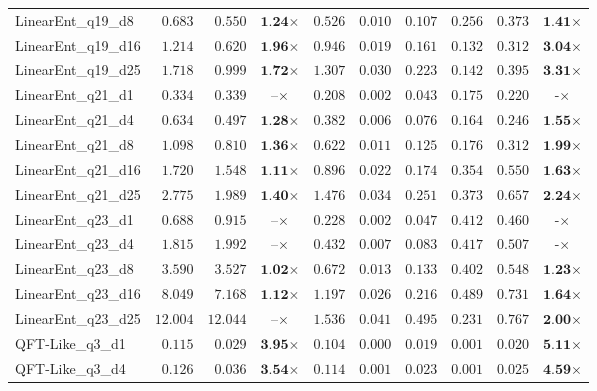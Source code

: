 \begin{table*}[t]
{\begin{tabular}{| l || r r c || r r r r r c |}
LinearEnt\_q19\_d8 & $0.683$ & $0.550$ & $\textbf{1.24}$$\times$ & $0.526$ & $0.010$ & $0.107$ & $0.256$ & $0.373$ & $\textbf{1.41}$$\times$ \\
LinearEnt\_q19\_d16 & $1.214$ & $0.620$ & $\textbf{1.96}$$\times$ & $0.946$ & $0.019$ & $0.161$ & $0.132$ & $0.312$ & $\textbf{3.04}$$\times$ \\
LinearEnt\_q19\_d25 & $1.718$ & $0.999$ & $\textbf{1.72}$$\times$ & $1.307$ & $0.030$ & $0.223$ & $0.142$ & $0.395$ & $\textbf{3.31}$$\times$ \\
LinearEnt\_q21\_d1 & $0.334$ & $0.339$ & $\textbf{--}$$\times$ & $0.208$ & $0.002$ & $0.043$ & $0.175$ & $0.220$ & $\textbf{-}$$\times$ \\
LinearEnt\_q21\_d4 & $0.634$ & $0.497$ & $\textbf{1.28}$$\times$ & $0.382$ & $0.006$ & $0.076$ & $0.164$ & $0.246$ & $\textbf{1.55}$$\times$ \\
LinearEnt\_q21\_d8 & $1.098$ & $0.810$ & $\textbf{1.36}$$\times$ & $0.622$ & $0.011$ & $0.125$ & $0.176$ & $0.312$ & $\textbf{1.99}$$\times$ \\
LinearEnt\_q21\_d16 & $1.720$ & $1.548$ & $\textbf{1.11}$$\times$ & $0.896$ & $0.022$ & $0.174$ & $0.354$ & $0.550$ & $\textbf{1.63}$$\times$ \\
LinearEnt\_q21\_d25 & $2.775$ & $1.989$ & $\textbf{1.40}$$\times$ & $1.476$ & $0.034$ & $0.251$ & $0.373$ & $0.657$ & $\textbf{2.24}$$\times$ \\
LinearEnt\_q23\_d1 & $0.688$ & $0.915$ & $\textbf{--}$$\times$ & $0.228$ & $0.002$ & $0.047$ & $0.412$ & $0.460$ & $\textbf{-}$$\times$ \\
LinearEnt\_q23\_d4 & $1.815$ & $1.992$ & $\textbf{--}$$\times$ & $0.432$ & $0.007$ & $0.083$ & $0.417$ & $0.507$ & $\textbf{-}$$\times$ \\
LinearEnt\_q23\_d8 & $3.590$ & $3.527$ & $\textbf{1.02}$$\times$ & $0.672$ & $0.013$ & $0.133$ & $0.402$ & $0.548$ & $\textbf{1.23}$$\times$ \\
LinearEnt\_q23\_d16 & $8.049$ & $7.168$ & $\textbf{1.12}$$\times$ & $1.197$ & $0.026$ & $0.216$ & $0.489$ & $0.731$ & $\textbf{1.64}$$\times$ \\
LinearEnt\_q23\_d25 & $12.004$ & $12.044$ & $\textbf{--}$$\times$ & $1.536$ & $0.041$ & $0.495$ & $0.231$ & $0.767$ & $\textbf{2.00}$$\times$ \\
QFT-Like\_q3\_d1 & $0.115$ & $0.029$ & $\textbf{3.95}$$\times$ & $0.104$ & $0.000$ & $0.019$ & $0.001$ & $0.020$ & $\textbf{5.11}$$\times$ \\
QFT-Like\_q3\_d4 & $0.126$ & $0.036$ & $\textbf{3.54}$$\times$ & $0.114$ & $0.001$ & $0.023$ & $0.001$ & $0.025$ & $\textbf{4.59}$$\times$ \\

\end{tabular}}
\end{table*}
